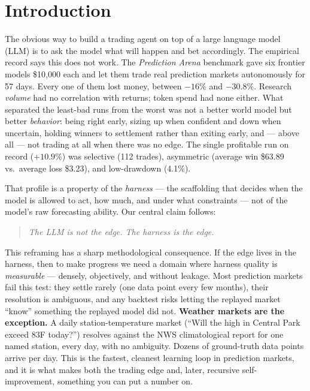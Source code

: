 \documentclass[10pt,twocolumn]{article}
\begin{document}
\section{Introduction}

The obvious way to build a trading agent on top of a large language model (LLM)
is to ask the model what will happen and bet accordingly. The empirical record
says this does not work. The \emph{Prediction Arena} benchmark
\cite{predarena} gave six frontier models \$10{,}000 each and let them trade
real prediction markets autonomously for 57 days. Every one of them lost money,
between $-16\%$ and $-30.8\%$. Research \emph{volume} had no correlation with
returns; token spend had none either. What separated the least-bad runs from the
worst was not a better world model but better \emph{behavior}: being right early,
sizing up when confident and down when uncertain, holding winners to settlement
rather than exiting early, and --- above all --- not trading at all when there
was no edge. The single profitable run on record ($+10.9\%$) was selective (112
trades), asymmetric (average win \$63.89 vs.\ average loss \$3.23), and
low-drawdown (4.1\%).

That profile is a property of the \emph{harness} --- the scaffolding that
decides when the model is allowed to act, how much, and under what constraints
--- not of the model's raw forecasting ability. Our central claim follows:

\begin{quote}
\emph{The LLM is not the edge. The harness is the edge.}
\end{quote}

This reframing has a sharp methodological consequence. If the edge lives in the
harness, then to make progress we need a domain where harness quality is
\emph{measurable} --- densely, objectively, and without leakage. Most prediction
markets fail this test: they settle rarely (one data point every few months),
their resolution is ambiguous, and any backtest risks letting the replayed
market ``know'' something the replayed model did not. \textbf{Weather markets are
the exception.} A daily station-temperature market (``Will the high in Central
Park exceed 83\textdegree F today?'') resolves against the NWS climatological
report for one named station, every day, with no ambiguity. Dozens of
ground-truth data points arrive per day. This is the fastest, cleanest learning
loop in prediction markets, and it is what makes both the trading edge and,
later, recursive self-improvement, something you can put a number on.
\end{document}
